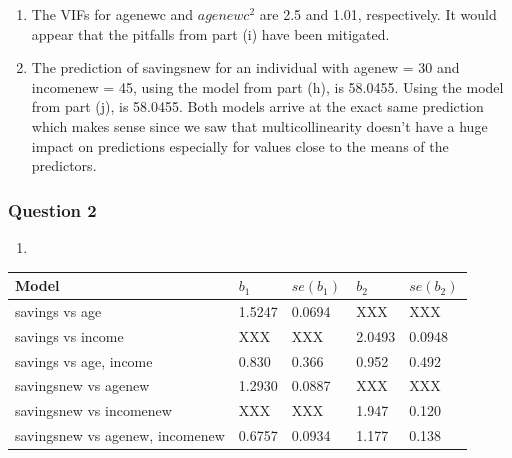\documentclass{article}
\begin{document}
\begin{enumerate}
\def\labelenumi{\alph{enumi})}
\setcounter{enumi}{10}
\item
  The VIFs for agenewc and \(agenewc^2\) are 2.5 and 1.01, respectively.
  It would appear that the pitfalls from part (i) have been mitigated.
\item
  The prediction of savingsnew for an individual with agenew = 30 and
  incomenew = 45, using the model from part (h), is 58.0455. Using the
  model from part (j), is 58.0455. Both models arrive at the exact same
  prediction which makes sense since we saw that multicollinearity
  doesn't have a huge impact on predictions especially for values close
  to the means of the predictors.
\end{enumerate}

    \subsubsection{Question 2}\label{question-2}

\begin{enumerate}
\def\labelenumi{\alph{enumi})}
\item
\end{enumerate}

\begin{longtable}[c]{@{}lllll@{}}
\toprule
Model & \(b_1\) & \(se(b_1)\) & \(b_2\) & \(se(b_2)\)\tabularnewline
\midrule
\endhead
savings vs age & 1.5247 & 0.0694 ~ & XXX & XXX\tabularnewline
savings vs income & XXX & XXX & 2.0493 & 0.0948 ~\tabularnewline
savings vs age, income & 0.830 & 0.366 & 0.952 & 0.492\tabularnewline
savingsnew vs agenew & 1.2930 & 0.0887 & XXX & XXX\tabularnewline
savingsnew vs incomenew & XXX & XXX & 1.947 & 0.120\tabularnewline
savingsnew vs agenew, incomenew & 0.6757 & 0.0934 & 1.177 &
0.138\tabularnewline
\bottomrule
\end{longtable}
\end{document}
